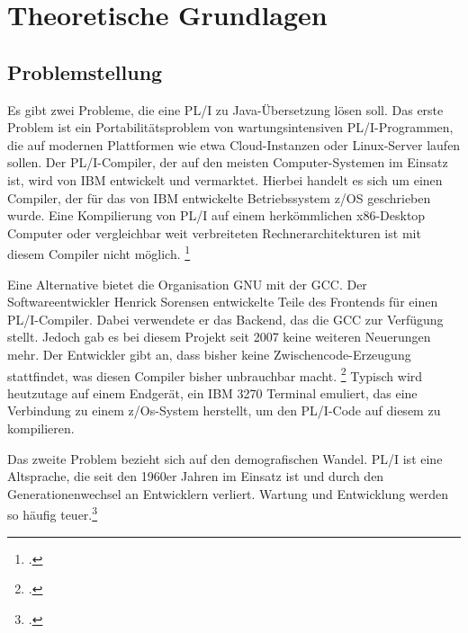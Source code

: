 



\pagebreak
\section{Theoretische Grundlagen}
\subsection{Problemstellung}
	
Es gibt zwei Probleme, die eine PL/I zu Java-Übersetzung lösen soll. 
Das erste Problem ist ein Portabilitätsproblem von wartungsintensiven PL/I-Programmen, die auf modernen Plattformen wie etwa Cloud-Instanzen oder Linux-Server laufen sollen.
Der PL/I-Compiler, der auf den meisten Computer-Systemen im Einsatz ist, wird von IBM entwickelt und vermarktet. Hierbei handelt es sich um einen Compiler, der für das von IBM entwickelte Betriebssystem z/OS geschrieben wurde. Eine Kompilierung von PL/I auf einem herkömmlichen x86-Desktop Computer oder vergleichbar weit verbreiteten Rechnerarchitekturen ist mit diesem Compiler nicht möglich. \footcite[Vgl. ][]{plicomp}


Eine Alternative bietet die Organisation GNU mit der \ac{GCC}. Der Softwareentwickler Henrick Sorensen entwickelte Teile des Frontends für einen PL/I-Compiler. Dabei verwendete er das Backend, das die \ac{GCC} zur Verfügung stellt. Jedoch gab es bei diesem Projekt seit 2007 keine weiteren Neuerungen mehr. Der Entwickler gibt an, dass bisher keine Zwischencode-Erzeugung stattfindet, was diesen Compiler bisher unbrauchbar macht. \footcite[Vgl. ][]{pligcc} 
Typisch wird heutzutage auf einem Endgerät, ein IBM 3270 Terminal emuliert, das eine Verbindung zu einem z/Os-System herstellt, um den PL/I-Code auf diesem zu kompilieren.

Das zweite Problem bezieht sich auf den demografischen Wandel. PL/I ist eine Altsprache, die seit den 1960er Jahren im Einsatz ist und durch den Generationenwechsel an Entwicklern verliert. Wartung und Entwicklung werden so häufig teuer.\footcite[Vgl. ][S. 227ff.]{histopli} 

